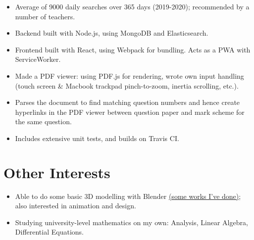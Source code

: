 \begin{itemize}
    \begin{itemize}
      \item Average of \raisebox{0.2\baselineskip}{\texttildelow}9000 daily searches over 365 days (2019-2020); recommended by a number of teachers.
      \item Backend built with Node.js, using MongoDB and Elasticsearch.
      \item Frontend built with React, using Webpack for bundling. Acts as a PWA with ServiceWorker.
      \item Made a PDF viewer: using PDF.js for rendering, wrote own input handling (touch screen \& Macbook trackpad pinch-to-zoom, inertia scrolling, etc.).
      \item Parses the document to find matching question numbers and hence create hyperlinks in the PDF viewer between question paper and mark scheme for the same question.
      \item Includes extensive unit tests, and builds on Travis CI.
    \end{itemize}

  \end{itemize}

  \section{Other Interests}

  \begin{itemize}[itemsep=0.1\parskip]
    \item Able to do some basic 3D modelling with Blender \href{https://maowtm.org/Artworks/}{\color{link}(some works I've done)}; also interested in animation and design.

    \item Studying university-level mathematics on my own: Analysis, Linear Algebra, Differential Equations.
  \end{itemize}


